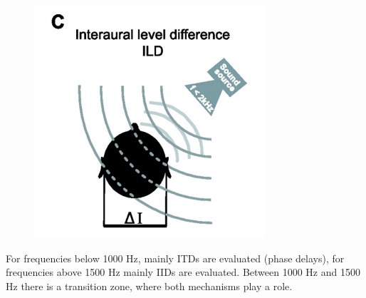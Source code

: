 \documentclass[BTech]{nitkdiss}
\begin{document}
\begin{figure}[h!]
\begin{minipage}[b]{0.3\textwidth}
  \end{minipage}
  \begin{minipage}[b]{0.3\textwidth}
    \includegraphics[width=\textwidth]{C}
  \end{minipage}
\end{figure}
For frequencies below 1000 Hz, mainly ITDs are evaluated (phase delays), for frequencies above 1500 Hz mainly IIDs are evaluated. Between 1000 Hz and 1500 Hz there is a transition zone, where both mechanisms play a role.
\end{document}
